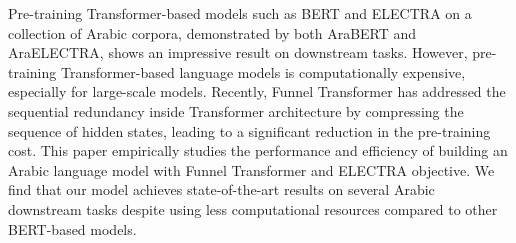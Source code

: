 Pre-training Transformer-based models such as BERT and ELECTRA on a collection of Arabic corpora, demonstrated by both AraBERT and AraELECTRA, shows an impressive result on downstream tasks. However, pre-training Transformer-based language models is computationally expensive, especially for large-scale models. Recently, Funnel Transformer has addressed the sequential redundancy inside Transformer architecture by compressing the sequence of hidden states, leading to a significant reduction in the pre-training cost. This paper empirically studies the performance and efficiency of building an Arabic language model with Funnel Transformer and ELECTRA objective. We find that our model achieves state-of-the-art results on several Arabic downstream tasks despite using less computational resources compared to other BERT-based models.
